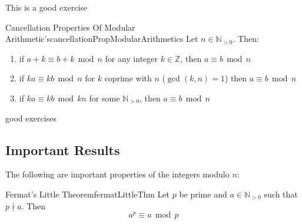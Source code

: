 \documentclass{book}
\newcommand{\N}{{\mathbb{N}}}
\newcommand{\Z}{{\mathbb{Z}}}
\renewcommand{\mod}{\,\operatorname{mod}\,}
\begin{document}
\begin{Proof}
	This is a good exercise
\end{Proof}


\begin{prop}{Cancellation Properties Of Modular Arithmetic's}{cancellationPropModularArithmetics}
	Let $n \in \N_{>0}$. Then:
	\begin{enumerate}
		\item if $a+k\equiv b+k\mod n$ for any integer $k \in \Z$, then $a\equiv b \mod n$
		\item if $ka\equiv kb\mod n$ for $k$ coprime with $n$ ($\gcd(k,n) = 1$) then $a\equiv b \mod n$
		\item if $ka\equiv kb \mod kn$ for some $\N_{>0}$, then $a\equiv b \mod n$
	\end{enumerate}
\end{prop}

\begin{Proof}
	good exercises
\end{Proof}

\subsection*{Important Results}

The following are important properties of the integers modulo $n$:

\begin{thm}{Fermat's Little Theorem}{fermatLittleThm}
	Let $p$ be prime and $a \in \N_{>0}$ such that $p\nmid a$. Then
	\[
		a^{p} \equiv a \mod p
	\]
\end{thm}
\end{document}
